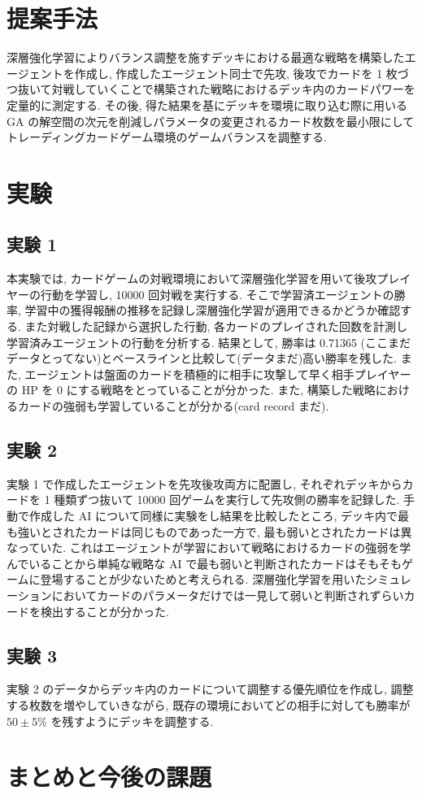 \documentclass[a4paper,twoside,twocolumn,10pt]{article}
\begin{document}
\section{提案手法}
深層強化学習によりバランス調整を施すデッキにおける最適な戦略を構築したエージェントを作成し, 作成したエージェント同士で先攻, 後攻でカードを 1 枚づつ抜いて対戦していくことで構築された戦略におけるデッキ内のカードパワーを定量的に測定する. その後, 得た結果を基にデッキを環境に取り込む際に用いる GA の解空間の次元を削減しパラメータの変更されるカード枚数を最小限にしてトレーディングカードゲーム環境のゲームバランスを調整する. 

\section{実験}
\subsection{実験 1}
 本実験では, カードゲームの対戦環境において深層強化学習を用いて後攻プレイヤーの行動を学習し, 10000 回対戦を実行する. そこで学習済エージェントの勝率, 学習中の獲得報酬の推移を記録し深層強化学習が適用できるかどうか確認する. また対戦した記録から選択した行動, 各カードのプレイされた回数を計測し学習済みエージェントの行動を分析する.
結果として, 勝率は 0.71365 (ここまだデータとってない)とベースラインと比較して(データまだ)高い勝率を残した. また, エージェントは盤面のカードを積極的に相手に攻撃して早く相手プレイヤーの HP を 0 にする戦略をとっていることが分かった. また, 構築した戦略におけるカードの強弱も学習していることが分かる(card record まだ).
\subsection{実験 2}
実験 1 で作成したエージェントを先攻後攻両方に配置し, それぞれデッキからカードを 1 種類ずつ抜いて 10000 回ゲームを実行して先攻側の勝率を記録した.
手動で作成した AI について同様に実験をし結果を比較したところ, デッキ内で最も強いとされたカードは同じものであった一方で, 最も弱いとされたカードは異なっていた. これはエージェントが学習において戦略におけるカードの強弱を学んでいることから単純な戦略な AI で最も弱いと判断されたカードはそもそもゲームに登場することが少ないためと考えられる. 深層強化学習を用いたシミュレーションにおいてカードのパラメータだけでは一見して弱いと判断されずらいカードを検出することが分かった.
\subsection{実験 3}
実験 2 のデータからデッキ内のカードについて調整する優先順位を作成し, 調整する枚数を増やしていきながら, 既存の環境においてどの相手に対しても勝率が $50 \pm 5$\% を残すようにデッキを調整する. 



\section{まとめと今後の課題}



\end{document}
